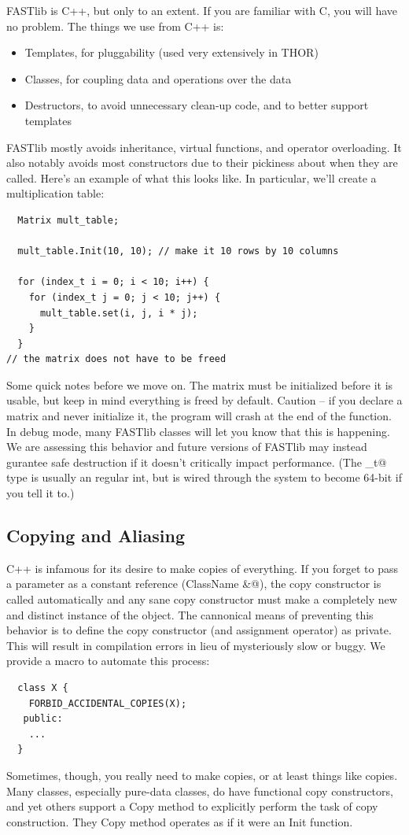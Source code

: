 \documentclass[letter]{report}
\begin{document}
FASTlib is C++, but only to an extent. If you are familiar with C, you will have no problem. The things we use from C++ is:
\begin{itemize}
\item Templates, for pluggability (used very extensively in THOR)
\item Classes, for coupling data and operations over the data
\item Destructors, to avoid unnecessary clean-up code, and to better support templates 
\end{itemize}
FASTlib mostly avoids inheritance, virtual functions, and operator overloading. It also notably avoids most constructors due to their pickiness about when they are called. Here's an example of what this looks like. In particular, we'll create a multiplication table:
\begin{verbatim}
  Matrix mult_table;

  mult_table.Init(10, 10); // make it 10 rows by 10 columns

  for (index_t i = 0; i < 10; i++) {
    for (index_t j = 0; j < 10; j++) {
      mult_table.set(i, j, i * j);
    }
  }
// the matrix does not have to be freed
\end{verbatim}
Some quick notes before we move on. The matrix must be initialized before it is usable, but keep in mind everything is freed by default. Caution -- if you declare a matrix and never initialize it, the program will crash at the end of the function. In debug mode, many FASTlib classes will let you know that this is happening.  We are assessing this behavior and future versions of FASTlib may instead gurantee safe destruction if it doesn't critically impact performance.  (The \verb@index_t@ type is usually an regular int, but is wired through the system to become 64-bit if you tell it to.)

\subsection{Copying and Aliasing}

C++ is infamous for its desire to make copies of everything. If you forget to pass a parameter as a constant reference (\verb@const ClassName \&@), the copy constructor is called automatically and any sane copy constructor must make a completely new and distinct instance of the object.  The cannonical means of preventing this behavior is to define the copy constructor (and assignment operator) as private.  This will result in compilation errors in lieu of mysteriously slow or buggy.  We provide a macro to automate this process:
\begin{verbatim}
  class X {
    FORBID_ACCIDENTAL_COPIES(X);
   public:
    ...
  }
\end{verbatim}
Sometimes, though, you really need to make copies, or at least things like copies. Many classes, especially pure-data classes, do have functional copy constructors, and yet others support a Copy method to explicitly perform the task of copy construction.  They Copy method operates as if it were an Init function.
\end{document}
